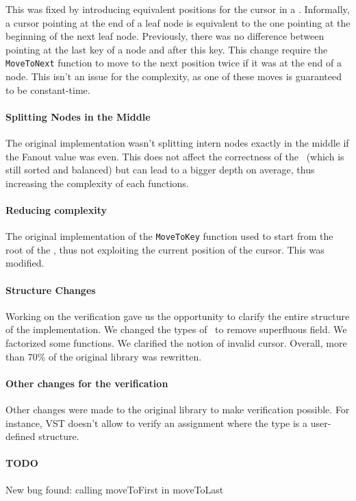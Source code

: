 This was fixed by introducing equivalent positions for the cursor in a \btree.
Informally, a cursor pointing at the end of a leaf node is equivalent to the one pointing at the beginning of the next leaf node.
Previously, there was no difference between pointing at the last key of a node and after this key.
This change require the \texttt{MoveToNext} function to move to the next position twice if it was at the end of a node.
This isn't an issue for the complexity, as one of these moves is guaranteed to be constant-time.

\paragraph{Splitting Nodes in the Middle}
The original implementation wasn't splitting intern nodes exactly in the middle if the Fanout value was even.
This does not affect the correctness of the \btree\ (which is still sorted and balanced) but can lead to a bigger depth on average, thus increasing the complexity of each functions.

\paragraph{Reducing complexity}
The original implementation of the \texttt{MoveToKey} function used to start from the root of the \btree, thus not exploiting the current position of the cursor. This was modified.

\paragraph{Structure Changes}
Working on the verification gave us the opportunity to clarify the entire structure of the implementation.
We changed the types of \btrees\ to remove superfluous field. We factorized some functions. We clarified the notion of invalid cursor.
Overall, more than 70\% of the original library was rewritten.

\paragraph{Other changes for the verification}
Other changes were made to the original library to make verification possible.
For instance, VST doesn't allow to verify an assignment where the type is a user-defined structure.


\paragraph{TODO} New bug found: calling moveToFirst in moveToLast
